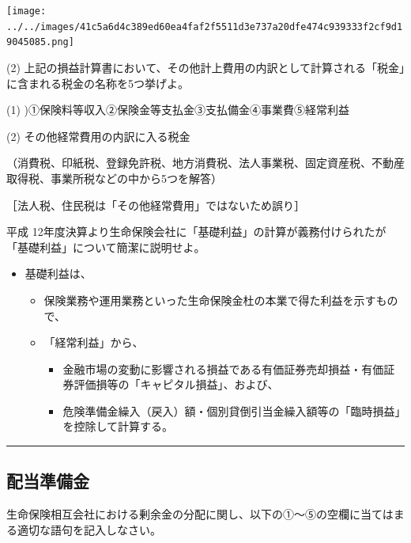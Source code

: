 \documentclass[report,gutter=10mm,fore-edge=10mm,uplatex,dvipdfmx]{jlreq}
\begin{document}
\texttt{[image: ../../images/41c5a6d4c389ed60ea4faf2f5511d3e737a20dfe474c939333f2cf9d19045085.png]}

(2) 上記の損益計算書において、その他計上費用の内訳として計算される「税金」に含まれる税金の名称を5つ挙げよ。


(1) )①保険料等収入②保険金等支払金③支払備金④事業費⑤経常利益

(2) その他経常費用の内訳に入る税金

（消費税、印紙税、登録免許税、地方消費税、法人事業税、固定資産税、不動産取得税、事業所税などの中から5つを解答）

［法人税、住民税は「その他経常費用」ではないため誤り］



平成 12年度決算より生命保険会社に「基礎利益」の計算が義務付けられたが「基礎利益」について簡潔に説明せよ。


\begin{itemize}
\tightlist
\item
  基礎利益は、

  \begin{itemize}
  \tightlist
  \item
    保険業務や運用業務といった生命保険金杜の本業で得た利益を示すもので、
  \item
    「経常利益」から、

    \begin{itemize}
    \tightlist
    \item
      金融市場の変動に影響される損益である有価証券売却損益・有価証券評価損等の「キャピタル損益」、および、
    \item
      危険準備金繰入（戻入）額・個別貸倒引当金繰入額等の「臨時損益」を控除して計算する。
    \end{itemize}
  \end{itemize}
\end{itemize}

\begin{center}\rule{0.5\linewidth}{0.5pt}\end{center}

\subsection{配当準備金}


生命保険相互会社における剰余金の分配に関し、以下の①～⑤の空欄に当てはまる適切な語句を記入しなさい。
\end{document}
